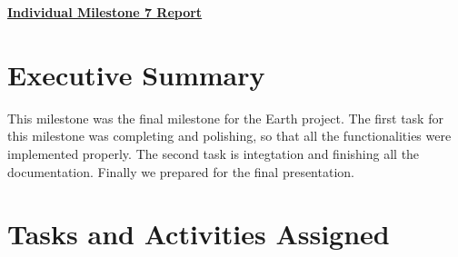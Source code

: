 \documentclass{article}
\begin{document}
\pagestyle{headings}

\begin{center}
{\LARGE\textbf{\underline{{Individual Milestone 7 Report}}}}
\end{center}

\section*{Executive Summary}

This milestone was the final milestone for the Earth project. The first task for this milestone was completing and polishing, so that all the functionalities were implemented properly. The second task is integtation and finishing all the documentation. Finally we prepared for the final presentation.
\section*{Tasks and Activities Assigned}
\end{document}
